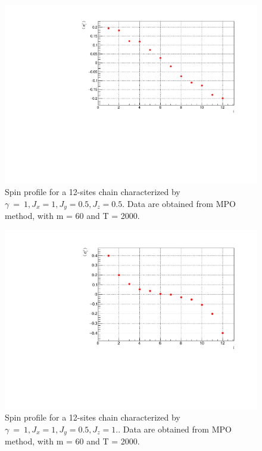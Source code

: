 \begin{figure}[H]
    \centering
    \includegraphics[scale=0.7]{Figures/12sites/LML012m060Time002000_J10505.pdf}
    \caption{Spin profile for a 12-sites chain characterized by $\gamma~=~1, J_x=1, J_y=0.5, J_z=0.5$. Data are obtained from MPO method, with m = 60 and T = 2000.}
    \label{fig:my_label}
\end{figure}

\begin{figure}[H]
    \centering
    \includegraphics[scale=0.7]{Figures/12sites/LML012m060Time002000_J1051.pdf}
    \caption{Spin profile for a 12-sites chain characterized by $\gamma~=~1, J_x=1, J_y=0.5, J_z=1.$. Data are obtained from MPO method, with m = 60 and T = 2000.}
    \label{fig:my_label}
\end{figure}

